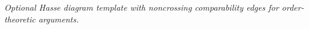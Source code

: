 \begin{center}
    \resizebox{0.46\linewidth}{!}{}

    \medskip
    \textit{Optional Hasse diagram template with noncrossing comparability edges for order-theoretic arguments.}
\end{center}
